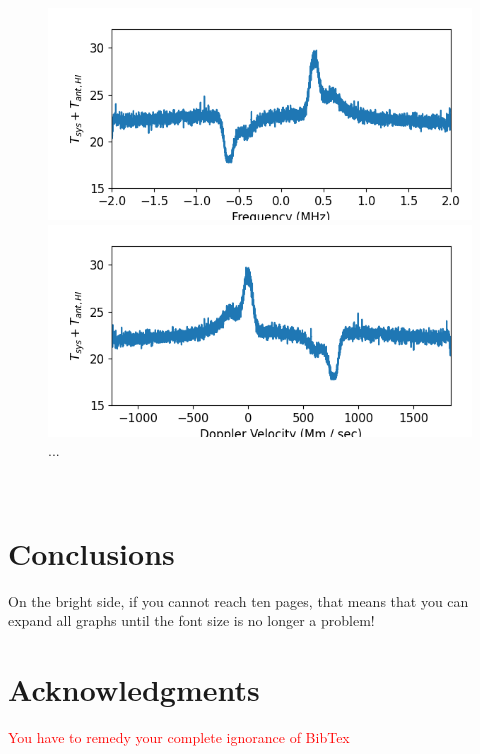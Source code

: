 \documentclass[12pt]{article}
\begin{document}
\begin{figure}
\centering
\begin{minipage}{.45\textwidth}
	\centering
	\includegraphics[width=\linewidth]{cass_vs_frq}
	\caption{...}
	\label{fig:cass_vs_frq}
\end{minipage} \hfill%
\begin{minipage}{.45\textwidth}
	\centering
	\includegraphics[width=\linewidth]{cass_vs_vel}
	\caption{...}
	\label{fig:cass_vs_vel}
\end{minipage}
\end{figure}

\

\section{Conclusions}

On the bright side, if you cannot reach ten pages, that means that you can expand all graphs until the font size is no longer a problem!

\section{Acknowledgments}

\textcolor{red}{You have to remedy your complete ignorance of BibTex}
\end{document}
